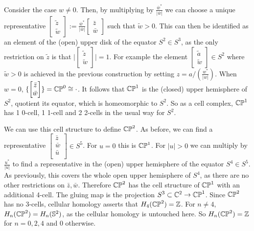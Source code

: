 Consider the case $w\neq 0$. Then, by multiplying by $\frac{\bar{w}^*}{|\bar{w}|}$ we can choose a unique representative $\begin{bmatrix} \tilde{z}\\ \tilde{w} \end{bmatrix}:= \frac{\bar{w}^*}{|\bar{w}|}\begin{bmatrix}\bar{z}\\ \bar{w} \end{bmatrix}$ such that $\tilde{w}> 0$. This can then be identified as an element of the (open) upper disk of the equator $S^2\in S^3$, as the only restriction on $\tilde{z}$ is that $\big|\begin{bmatrix}\tilde{z}\\ \tilde{w} \end{bmatrix} \big|=1$. For example the element $\begin{bmatrix}\tilde{a} \\ \tilde{w}\end{bmatrix} \in S^2$ where $\tilde{w}>0$ is achieved in the previous construction by setting $z=a/(\frac{w^*}{|w|})$. When $w=0$, $\{\begin{bmatrix} \bar{z}\\ \bar{w} \end{bmatrix}\}=\mathbb{CP}^{0}\cong \cdot$. It follows that $\mathbb{CP}^{1}$ is the (closed) upper hemisphere of $S^2$, quotient its equator, which is homeomorphic to $S^2$. So as a cell complex, $\mathbb{CP}^{1}$ has 1 0-cell, 1 1-cell and 2 2-cells in the usual way for $S^2$.

We can use this cell structure to define $\mathbb{CP}^{2}$. As before, we can find a representative $\begin{bmatrix}\bar{z}\\ \bar{w}\\ \bar{u}\\ \end{bmatrix}\in S^5$. For $u=0$ this is $\mathbb{CP}^{1}$. For $|u|>0$ we can multiply by $\frac{u^*}{|u|}$ to find a representative in the (open) upper hemisphere of the equator $S^4\in S^5$. As previously, this covers the whole open upper hemisphere of $S^4$, as there are no other restrictions on $\bar{z},\bar{w}$. Therefore $\mathbb{CP}^{2}$ has the cell structure of $\mathbb{CP}^{1}$ with an additional 4-cell. The gluing map is the projection $S^3\subset \mathbb{C}^2 \rightarrow \mathbb{CP}^{1}$. Since $\mathbb{CP}^{2}$ has no 3-cells, cellular homology asserts that $H_4(\mathbb{CP}^{2})=\mathbb{Z}$. For $n\neq 4$, $H_n(\mathbb{CP}^{2})=H_n(\mathbb{S}^{2})$, as the cellular homology is untouched here. So $H_n(\mathbb{CP}^{2})=\mathbb{Z}$ for $n=0,2,4$ and $0$ otherwise.

